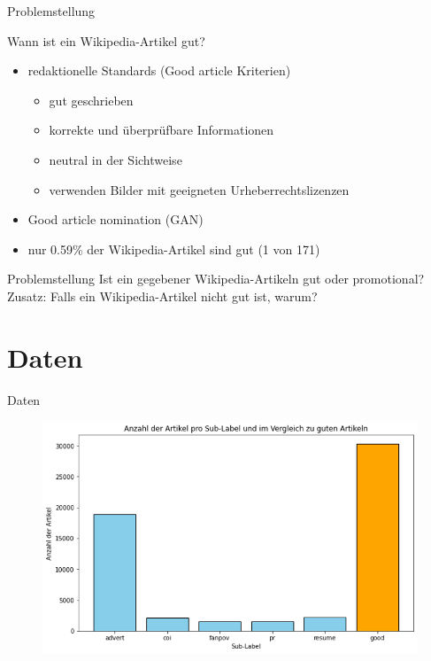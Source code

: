 \documentclass[aspectratio=169]{beamer} %
\begin{document}
\begin{frame}{Problemstellung}
    \begin{block}{Wann ist ein Wikipedia-Artikel gut?}
        \begin{itemize}
            \item redaktionelle Standards (Good article Kriterien)
            \begin{itemize}
                \item gut geschrieben
            
                \item korrekte und \"uberpr\"ufbare Informationen

                \item neutral in der Sichtweise

                \item verwenden Bilder mit geeigneten Urheberrechtslizenzen
            \end{itemize}

            \item Good article nomination (GAN)

            \item nur 0.59\% der Wikipedia-Artikel sind gut (1 von 171)
        \end{itemize}
    \end{block}

    \begin{block}{Problemstellung}
        Ist ein gegebener Wikipedia-Artikeln gut oder promotional? \\

        Zusatz: Falls ein Wikipedia-Artikel nicht gut ist, warum?
    \end{block}
\end{frame}

\section{Daten}

\begin{frame}{Daten}
    \begin{figure}
        \centering
        \includegraphics[width=0.8\linewidth]{figures/distribution_multiple_classes.png}
    \end{figure}
\end{frame}
\end{document}
